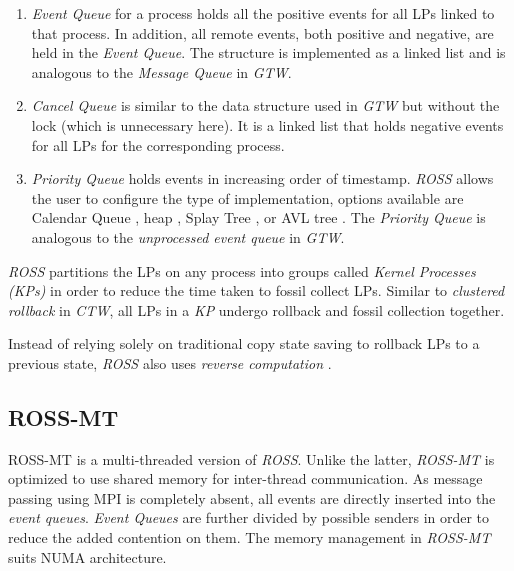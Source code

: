\documentclass[11pt]{book}
\begin{document}
\begin{enumerate}

\item \emph{Event Queue} for a process holds all the positive events for all LPs linked to that process.  In
  addition, all remote events, both positive and negative, are held in the \emph{Event Queue}.  The structure
  is implemented as a linked list and is analogous to the \emph{Message Queue} in \emph{GTW}.

\item \emph{Cancel Queue} is similar to the data structure used in \emph{GTW} but without the lock (which is
  unnecessary here).  It is a linked list that holds negative events for all LPs for the corresponding
  process.

\item \emph{Priority Queue} holds events in increasing order of timestamp.  \emph{ROSS} allows the user to
  configure the type of implementation, options available are Calendar Queue \cite{brown-88}, heap
  \cite{williams-64}, Splay Tree \cite{sleator-85}, or AVL tree \cite{andelson-62}.  The \emph{Priority Queue}
  is analogous to the \emph{unprocessed event queue} in \emph{GTW}.

\end{enumerate}

\emph{ROSS} partitions the LPs on any process into groups called \emph{Kernel Processes (KPs)} in order to
reduce the time taken to fossil collect LPs.  Similar to \emph{clustered rollback} in \emph{CTW}, all LPs in a
\emph{KP} undergo rollback and fossil collection together.

Instead of relying solely on traditional copy state saving to rollback LPs to a previous state, 
\emph{ROSS} also uses \emph{reverse computation} \cite{carothers-99}.  

\subsection{ROSS-MT}

ROSS-MT \cite{jagtap-12} is a multi-threaded version of \emph{ROSS}.  Unlike the latter, \emph{ROSS-MT} is
optimized to use shared memory for inter-thread communication.  As message passing using MPI is completely
absent, all events are directly inserted into the \emph{event queues}.  \emph{Event Queues} are further
divided by possible senders in order to reduce the added contention on them.  The memory management in
\emph{ROSS-MT} suits NUMA architecture.
\end{document}
